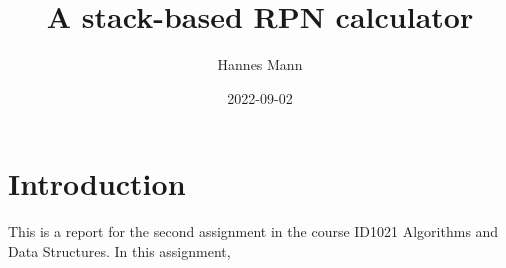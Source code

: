\documentclass[a4paper,11pt]{article}
\begin{document}
\title{
    \textbf{A stack-based RPN calculator}
}
\author{Hannes Mann}
\date{2022-09-02}

\maketitle

\section*{Introduction}

This is a report for the second assignment in the course ID1021 Algorithms and Data Structures. In this assignment,
\end{document}
